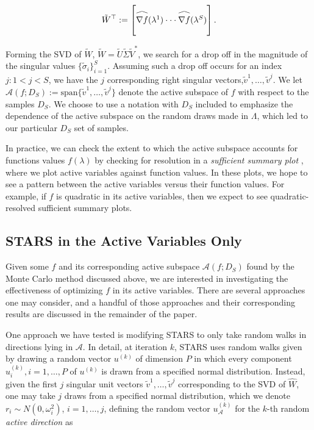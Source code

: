 \documentclass{amsart}
\newcommand{\A}{\mathcal{A}}
\newcommand\reallywidehat[1]{\arraycolsep=0pt\relax%
\begin{array}{c}
\stretchto{
  \scaleto{
    \scalerel*[\widthof{\ensuremath{#1}}]{\kern-.5pt\bigwedge\kern-.5pt}
    {\rule[-\textheight/2]{1ex}{\textheight}} %
  }{\textheight} %
}{0.5ex}\\           %
#1\\                 %
\rule{-1ex}{0ex}
\end{array}
}
\begin{document}
\begin{equation} \label{eq:16}
\tilde{W}^\top:=\begin{bmatrix}
\reallywidehat{\nabla f}(\lambda^1)
\cdot \cdot \cdot
\reallywidehat{\nabla f}(\lambda^S)\\
\end{bmatrix}.
\end{equation}  

Forming the SVD of $\tilde{W}$, $\tilde{W}=\tilde{U}\tilde{\Sigma}\tilde{V}^*$, we search for a drop off in the magnitude of the singular values $\{\tilde{\sigma}_i\}_{i=1}^S$. Assuming such a drop off occurs for an index $j:1<j<S$, we have the $j$ corresponding right singular vectors,$ \tilde{v}^1,\ldots,\tilde{v}^{j}$.  We let $\A\left(f; D_S \right):=\text{span}\{\tilde{v}^1,\ldots,\tilde{v}^{j}\}$ denote the active subspace of $f$ with respect to the samples $D_S$. We choose to use a notation with $D_S$ included to emphasize the dependence of the active subspace on the random draws made in $\Lambda$, which led to our particular $D_S$ set of samples.

In practice, we can check the extent to which the active subspace accounts for functions values $f(\lambda)$ 
by checking for resolution in a \emph{sufficient summary plot} \cite{Constantine2015}, where we plot active variables against function values. In these plots, we hope to see a pattern between the active variables versus their function values. For example, if $f$ is quadratic in its active variables, then we expect to see quadratic-resolved sufficient summary plots.



\subsection{STARS in the Active Variables Only} Given some $f$ and its corresponding active subspace $\A(f;D_S)$ found by the Monte Carlo method discussed above, we are interested in investigating the effectiveness of optimizing $f$ in its active variables. There are several approaches one may consider, and a handful of those approaches and their corresponding results are discussed in the remainder of the paper. 

One approach we have tested is modifying STARS to only take random walks in directions lying in $\A$. In detail, at iteration $k$, STARS uses random walks given by drawing a random vector $u^{(k)}$ of dimension $P$ in which every component $u_i^{(k)},i=1,\ldots,P$ of $u^{(k)}$ is  drawn from a specified normal distribution. Instead, given the first $j$ singular unit vectors $\tilde{v}^1,\ldots,\tilde{v}^j$ corresponding to the SVD of $\hat{W}$, one may take $j$ draws from a specified normal distribution, which we denote $r_i\sim N(0,\omega_i^2)$, $i=1,\ldots,j$, defining the random vector $u_\A^{(k)}$ for the $k$-th random \textit{active direction} as 
\end{document}
